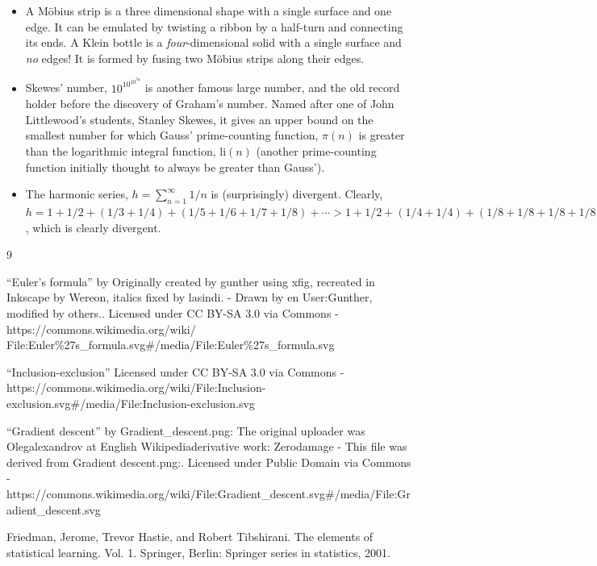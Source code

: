 \documentclass[11pt]{amsart}
\begin{document}
\begin{itemize}
\item A M\"obius strip is a three dimensional shape with a single surface and one edge. It can be emulated by twisting a ribbon by a half-turn and connecting its ends. A Klein bottle is a \emph{four}-dimensional solid with a single surface and \emph{no} edges! It is formed by fusing two M\"obius strips along their edges.
\item Skewes' number, $10^{10^{10^{34}}}$ is another famous large number, and the old record holder before the discovery of Graham's number. Named after one of John Littlewood's students, Stanley Skewes, it gives an upper bound on the smallest number for which Gauss' prime-counting function, $\pi(n)$ is greater than the logarithmic integral function, $\text{li}(n)$ (another prime-counting function initially thought to always be greater than Gauss').
\item The harmonic series, $h = \sum_{n=1}^{\infty} 1/n$ is (surprisingly) divergent. Clearly, $h = 1 + 1/2 + (1/3 + 1/4) + (1/5 + 1/6 + 1/7 + 1/8) + \cdots > 1 + 1/2 + (1/4 + 1/4) + (1/8 + 1/8 + 1/8 + 1/8) \cdots = 1 + 1/2 + 1/2 + 1/2 + \cdots$, which is clearly divergent.
\end{itemize}

\begin{thebibliography}{9}

``Euler's formula'' by Originally created by gunther using xfig, recreated in Inkscape by Wereon, italics fixed by lasindi. - Drawn by en User:Gunther, modified by others.. Licensed under CC BY-SA 3.0 via Commons - https://commons.wikimedia.org/wiki/\\File:Euler\%27s\_formula.svg\#/media/File:Euler\%27s\_formula.svg

``Inclusion-exclusion'' Licensed under CC BY-SA 3.0 via Commons - \\https://commons.wikimedia.org/wiki/File:Inclusion-exclusion.svg\#/media/File:Inclusion-exclusion.svg

``Gradient descent'' by Gradient\_descent.png: The original uploader was Olegalexandrov at English Wikipediaderivative work: Zerodamage - This file was derived from Gradient descent.png:. Licensed under Public Domain via Commons - \\https://commons.wikimedia.org/wiki/File:Gradient\_descent.svg\#/media/File:Gradient\_descent.svg

Friedman, Jerome, Trevor Hastie, and Robert Tibshirani. The elements of statistical learning. Vol. 1. Springer, Berlin: Springer series in statistics, 2001.

\end{thebibliography}
\end{document}
